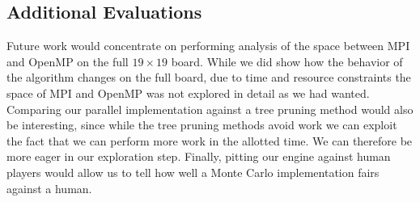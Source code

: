 \documentclass[nocopyrightspace, 10pt]{sigplanconf}
\begin{document}
\subsection{Additional Evaluations}


Future work would concentrate on performing analysis of the space between MPI and OpenMP on the full $19 \times 19$ board. While we did show how the behavior of the algorithm changes on the full board, due to time and resource constraints the space of MPI and OpenMP was not explored in detail as we had wanted. Comparing our parallel implementation against a tree pruning method would also be interesting, since while the tree pruning methods avoid work we can exploit the fact that we can perform more work in the allotted time. We can therefore be more eager in our exploration step. Finally, pitting our engine against human players would allow us to tell how well a Monte Carlo implementation fairs against a human.
\end{document}
